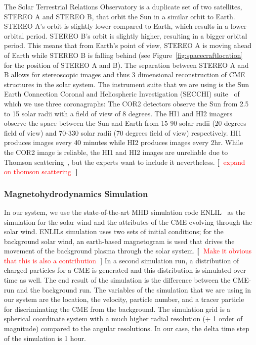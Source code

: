 \documentclass[journal]{vgtc}                %
\newcommand{\todo}[1] {\textbf{[~}\textcolor {red}{#1}\marginpar{\textcolor {red}{\centerline{{\Huge \textbf{!}}}}}\textbf{~]}}
\newcommand{\todo}[1] {\textbf{[~}\textcolor {red}{#1}\marginpar{\textcolor {red}{\centerline{{\Huge \textbf{!}}}}}\textbf{~]}}
\begin{document}
 The Solar Terrestrial Relations Observatory is a duplicate set of two satellites, STEREO A and STEREO B, that orbit the Sun in a similar orbit to Earth. STEREO A's orbit is slightly lower compared to Earth, which results in a lower orbital period. STEREO B's orbit is slightly higher, resulting in a bigger orbital period. This means that from Earth's point of view, STEREO A is moving ahead of Earth while STEREO B is falling behind (see Figure~\ref{fig:spacecraftlocation} for the position of STEREO A and B). The separation between STEREO A and B allows for stereoscopic images and thus 3 dimensional reconstruction of CME structures in the solar system. The instrument suite that we are using is the Sun Earth Connection Coronal and Heliospheric Investigation (SECCHI) suite~\cite{Socker:2000ic} of which we use three coronagraphs: The COR2 detectors observe the Sun from 2.5 to 15 solar radii with a field of view of 8 degrees. The HI1 and HI2 imagers observe the space between the Sun and Earth from 15-90 solar radii (20 degrees field of view) and 70-330 solar radii (70 degrees field of view) respectively. HI1 produces images every 40 minutes while HI2 produces images every 2hr. While the COR2 image is reliable, the HI1 and HI2 images are unreliable due to Thomson scattering~\cite{howard2012thomson}, but the experts want to include it nevertheless. \todo{expand on thomson scattering}

\subsubsection{Magnetohydrodynamics Simulation} \label{sec:mhd}
In our system, we use the state-of-the-art MHD simulation code ENLIL~\cite{odstrcil2002merging} as the simulation for the solar wind and the attributes of the CME evolving through the solar wind. ENLILs simulation uses two sets of initial conditions; for the background solar wind, an earth-based magnetogram is used that drives the movement of the background plasma through the solar system. \todo{Make it obvious that this is also a contribution} In a second simulation run, a distribution of charged particles for a CME is generated and this distribution is simulated over time as well. The end result of the simulation is the difference between the CME-run and the background run. The variables of the simulation that we are using in our system are the location, the velocity, particle number, and a tracer particle for discriminating the CME from the background. The simulation grid is a spherical coordinate system with a much higher radial resolution (+ 1 order of magnitude) compared to the angular resolutions. In our case, the delta time step of the simulation is 1 hour.
\end{document}
